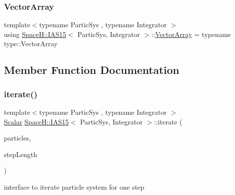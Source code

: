\subsubsection{\texorpdfstring{Vector\+Array}{VectorArray}}
{\footnotesize\ttfamily template$<$typename Partic\+Sys , typename Integrator $>$ \\
using \mbox{\hyperlink{class_space_h_1_1_i_a_s15}{Space\+H\+::\+I\+A\+S15}}$<$ Partic\+Sys, Integrator $>$\+::\mbox{\hyperlink{class_space_h_1_1_i_a_s15_a70aa5a3879ee4da4472dbeca219f9b3f}{Vector\+Array}} =  typename type\+::\+Vector\+Array}



\subsection{Member Function Documentation}
\mbox{\label{class_space_h_1_1_i_a_s15_a60d1a4d8ab5124bf3adc12624f1d7954}} 
\subsubsection{\texorpdfstring{iterate()}{iterate()}}
{\footnotesize\ttfamily template$<$typename Partic\+Sys , typename Integrator $>$ \\
\mbox{\hyperlink{class_space_h_1_1_i_a_s15_ac4ee5f40852d7b500ca50084eb35b012}{Scalar}} \mbox{\hyperlink{class_space_h_1_1_i_a_s15}{Space\+H\+::\+I\+A\+S15}}$<$ Partic\+Sys, Integrator $>$\+::iterate (\begin{DoxyParamCaption}\item[{Partic\+Sys \&}]{particles,  }\item[{\mbox{\hyperlink{class_space_h_1_1_i_a_s15_ac4ee5f40852d7b500ca50084eb35b012}{Scalar}}}]{step\+Length }\end{DoxyParamCaption})\hspace{0.3cm}{\ttfamily [inline]}}



interface to iterate particle system for one step 


